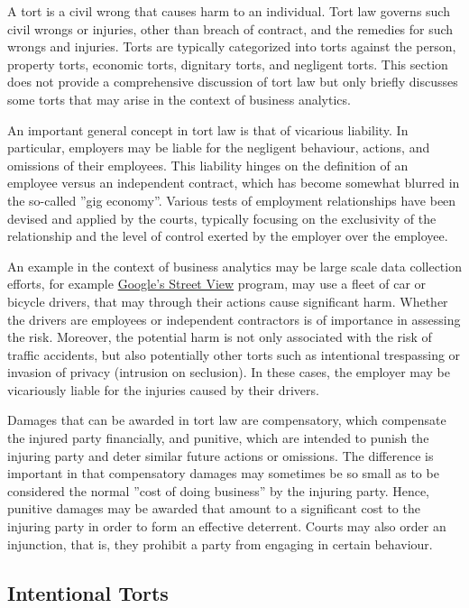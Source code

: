 A tort  is a civil wrong that causes harm to an individual. Tort law governs such civil wrongs or injuries, other than breach of contract, and the remedies for such wrongs and injuries. Torts are typically categorized into torts against the person, property torts, economic torts, dignitary torts, and negligent torts. This section does not provide a comprehensive discussion of tort law but only briefly discusses some torts that may arise in the context of business analytics. 

An important general concept in tort law is that of vicarious liability. In particular, employers may be liable for the negligent behaviour, actions, and omissions of their employees. This liability hinges on the definition of an employee versus an independent contract, which has become somewhat blurred in the so-called ''gig economy''. Various tests of employment relationships have been devised and applied by the courts, typically focusing on the exclusivity of the relationship and the level of control exerted by the employer over the employee. 

An example in the context of business analytics may be large scale data collection efforts, for example \href{https://en.wikipedia.org/wiki/Google_Street_View}{Google's Street View} program, may use a fleet of car or bicycle drivers, that may through their actions cause significant harm. Whether the drivers are employees or independent contractors is of importance in assessing the risk. Moreover, the potential harm is not only associated with the risk of traffic accidents, but also potentially other torts such as intentional trespassing or invasion of privacy (intrusion on seclusion). In these cases, the employer may be vicariously liable for the injuries caused by their drivers. 

Damages that can be awarded in tort law are compensatory, which compensate the injured party financially, and punitive, which are intended to punish the injuring party and deter similar future actions or omissions. The difference is important in that compensatory damages may sometimes be so small as to be considered the normal ''cost of doing business'' by the injuring party. Hence, punitive damages may be awarded that amount to a significant cost to the injuring party in order to form an effective deterrent. Courts may also order an injunction, that is, they prohibit a party from engaging in certain behaviour.

\subsection*{Intentional Torts}

